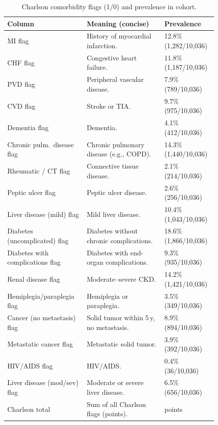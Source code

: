 \vspace{0.75\baselineskip}
\begin{table}[t]\centering
{\footnotesize\renewcommand{\arraystretch}{1.12}\setlength{\tabcolsep}{3pt}%
\caption{Charlson comorbidity flags (1/0) and prevalence in cohort.}
\label{app:tab-charlson}
\begin{tabular}{P{0.32\linewidth} P{0.34\linewidth} P{0.20\linewidth}}
\toprule
\textbf{Column} & \textbf{Meaning (concise)} & \textbf{Prevalence}\\
\midrule
MI flag        & History of myocardial infarction.                      & 12.8\% (1,282/10,036)\\
CHF flag     & Congestive heart failure.                              & 11.8\% (1,187/10,036)\\
PVD flag  & Peripheral vascular disease.                           & 7.9\% (789/10,036)\\
CVD flag      & Stroke or TIA.                                         & 9.7\% (975/10,036)\\
Dementia flag                     & Dementia.                                              & 4.1\% (412/10,036)\\
Chronic pulm.\ disease flag    & Chronic pulmonary disease (e.g., COPD).                & 14.3\% (1,440/10,036)\\
Rheumatic / CT flag& Connective tissue disease.                             & 2.1\% (214/10,036)\\
Peptic ulcer flag         & Peptic ulcer disease.                                  & 2.6\% (256/10,036)\\
Liver disease (mild) flag         & Mild liver disease.                                    & 10.4\% (1,043/10,036)\\
Diabetes (uncomplicated) flag  & Diabetes without chronic complications.                & 18.6\% (1,866/10,036)\\
Diabetes with complications flag  & Diabetes with end-organ complications.                 & 9.3\% (935/10,036)\\
Renal disease flag                & Moderate--severe CKD.               & 14.2\% (1,421/10,036)\\
Hemiplegia/paraplegia flag        & Hemiplegia or paraplegia.                              & 3.5\% (349/10,036)\\
Cancer (no metastasis) flag       & Solid tumor within 5\,y, no metastasis.                & 8.9\% (894/10,036)\\
Metastatic cancer flag            & Metastatic solid tumor.                                & 3.9\% (392/10,036)\\
HIV/AIDS flag                     & HIV/AIDS.                                              & 0.4\% (36/10,036)\\
Liver disease (mod/sev) flag & Moderate or severe liver disease.                    & 6.5\% (656/10,036)\\
Charlson total                    & Sum of all Charlson flags (points).                    & points\\
\bottomrule
\end{tabular}}
\end{table}

